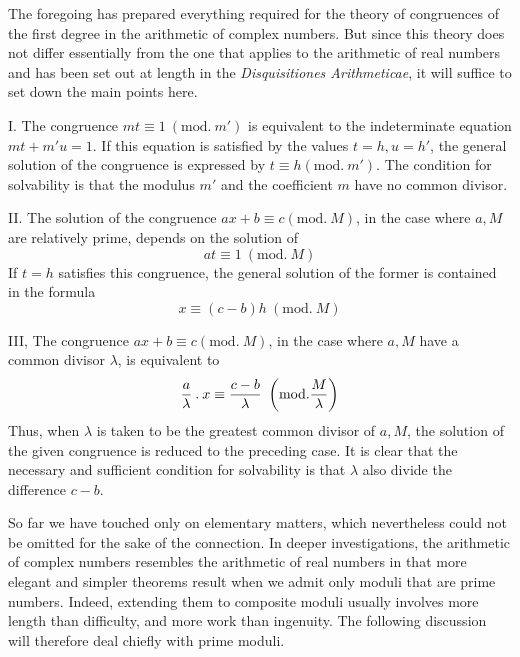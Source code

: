 The foregoing has prepared everything required for the theory of congruences of the first degree in the arithmetic of complex numbers. But since this theory
%
does not differ essentially from the one that applies to the arithmetic of real numbers and has been set out at length in the \emph{Disquisitiones Arithmeticae}, it will suffice to set down the main points here.

I. The congruence $mt\equiv1\ (\mathrm{mod.}\ m')$ is equivalent to the indeterminate equation $mt+m'u=1$. If this equation is satisfied by the values $t=h,u=h'$, the general solution of the congruence is expressed by $t\equiv h(\mathrm{mod.}\ m')$. The condition for solvability is that the modulus $m'$ and the coefficient $m$ have no common divisor.

II. The solution of the congruence $ax+b\equiv c(\mathrm{mod.}\ M)$, in the case where $a,M$ are relatively prime, depends on the solution of
\[
at\equiv1\ (\mathrm{mod.}\ M)
\]
If $t=h$ satisfies this congruence, the general solution of the former is contained in the formula
\[
x\equiv(c-b)h\ (\mathrm{mod.}\ M)
\]

\begingroup{}\relax
III, The congruence $ax+b\equiv c(\mathrm{mod.}\ M)$, in the case where $a,M$ have a common divisor $\lambda$, is equivalent to
\[
\frac a\lambda\mathbin{.} x\equiv\frac{c-b}\lambda\ \left(\mathrm{mod.}\frac M\lambda\right)
\]
Thus, when $\lambda$ is taken to be the greatest common divisor of $a,M$, the solution of the given congruence is reduced to the preceding case. It is clear that the necessary and sufficient condition for solvability is that $\lambda$ also divide the difference $c-b$.\endgroup

So far we have touched only on elementary matters, which nevertheless could not be omitted for the sake of the connection. In deeper investigations, the arithmetic of complex numbers resembles the arithmetic of real numbers in that more elegant and simpler theorems result when we admit only moduli that are prime numbers. Indeed, extending them to composite moduli usually involves more length than difficulty, and more work than ingenuity. The following discussion will therefore deal chiefly with prime moduli.

